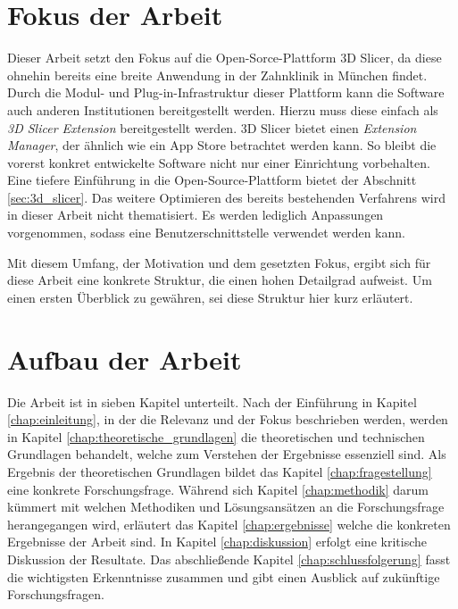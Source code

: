 \section{Fokus der Arbeit}
\label{sec:fokus_der-arbeit} Dieser Arbeit setzt den Fokus auf die Open-Sorce-Plattform
3D Slicer, da diese ohnehin bereits eine breite Anwendung in der Zahnklinik in München
findet. Durch die Modul- und Plug-in-Infrastruktur dieser Plattform kann die Software
auch anderen Institutionen bereitgestellt werden. Hierzu muss diese einfach als
\textit{3D Slicer Extension} bereitgestellt werden. 3D Slicer bietet einen
\textit{Extension Manager}, der ähnlich wie ein App Store betrachtet werden kann.
So bleibt die vorerst konkret entwickelte Software nicht nur einer Einrichtung vorbehalten.
Eine tiefere Einführung in die Open-Source-Plattform bietet der Abschnitt
\ref{sec:3d_slicer}. Das weitere Optimieren des bereits bestehenden Verfahrens wird
in dieser Arbeit nicht thematisiert. Es werden lediglich Anpassungen vorgenommen,
sodass eine Benutzerschnittstelle verwendet werden kann.

Mit diesem Umfang, der Motivation und dem gesetzten Fokus, ergibt sich für diese
Arbeit eine konkrete Struktur, die einen hohen Detailgrad aufweist. Um einen ersten
Überblick zu gewähren, sei diese Struktur hier kurz erläutert.

\section{Aufbau der Arbeit}
\label{sec:aufbau_der_arbeit} Die Arbeit ist in sieben Kapitel unterteilt. Nach der
Einführung in Kapitel \ref{chap:einleitung}, in der die Relevanz und der Fokus
beschrieben werden, werden in Kapitel \ref{chap:theoretische_grundlagen} die theoretischen
und technischen Grundlagen behandelt, welche zum Verstehen der Ergebnisse
essenziell sind. Als Ergebnis der theoretischen Grundlagen bildet das Kapitel \ref{chap:fragestellung}
eine konkrete Forschungsfrage. Während sich Kapitel \ref{chap:methodik} darum
kümmert mit welchen Methodiken und Lösungsansätzen an die Forschungsfrage
herangegangen wird, erläutert das Kapitel \ref{chap:ergebnisse} welche die konkreten
Ergebnisse der Arbeit sind. In Kapitel \ref{chap:diskussion} erfolgt eine
kritische Diskussion der Resultate. Das abschließende Kapitel \ref{chap:schlussfolgerung}
fasst die wichtigsten Erkenntnisse zusammen und gibt einen Ausblick auf zukünftige
Forschungsfragen.

